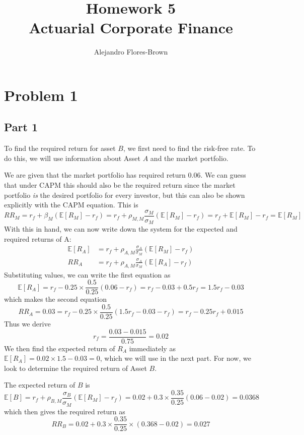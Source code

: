 \documentclass[12pt, letterpaper, parskip = full]{article}
\title{Homework 5 \\ Actuarial Corporate Finance}
\author{Alejandro Flores-Brown}
\newcommand{\Ex}[1]{\mathbb{E}\left[#1\right]}
\begin{document}
    \maketitle

    \section{Problem 1}

    \subsection{Part 1}

    To find the required return for asset \(B\), we first need to find the risk-free rate. To do this, we will use information about Asset \(A\) and the market portfolio. 

    We are given that the market portfolio has required return \(0.06\). We can guess that under CAPM this should also be the required return since the market portfolio \emph{is} the desired portfolio for every investor, but this can also be shown explicitly with the CAPM equation. This is 
    \[ RR_M = r_f + \beta_M (\Ex{R_M} - r_f) = r_f + \rho_{M,M} \frac{\sigma_M}{\sigma_M} (\Ex{R_M} - r_f) = r_f + \Ex{R_M} - r_f = \Ex{R_M}   \]
    With this in hand, we can now write down the system for the expected and required returns of A:
    \begin{align*}
    \Ex{R_A} &= r_f + \rho_{A,M} \frac{\sigma_A}{\sigma_M} (\Ex{R_M} - r_f) \\
    RR_A &= r_f + \rho_{A,M} \frac{\sigma_A}{\sigma_M} (\Ex{R_A} - r_f)
    \end{align*}
    Substituting values, we can write the first equation as
    \[ \Ex{R_A} = r_f - 0.25 \times \frac{0.5}{0.25} (0.06 - r_f) = r_f - 0.03 + 0.5 r_f = 1.5 r_f - 0.03 \]
    which makes the second equation
    \[ RR_A = 0.03 = r_f - 0.25 \times \frac{0.5}{0.25} (1.5 r_f - 0.03 - r_f) = r_f - 0.25 r_f + 0.015  \]
    Thus we derive
    \[ r_f = \frac{0.03 - 0.015}{0.75} = 0.02 \]
    We then find the expected return of \(R_A\) immediately as \(\Ex{R_A} = 0.02 \times 1.5 - 0.03 = 0\), which we will use in the next part. For now, we look to determine the required return of Asset \(B\).

    The expected return of \(B\) is
    \[ \Ex{B} = r_f + \rho_{B,M} \frac{\sigma_B}{\sigma_M} (\Ex{R_M} - r_f) = 0.02 + 0.3 \times \frac{0.35}{0.25} (0.06 - 0.02) = 0.0368   \]
    which then gives the required return as
    \[  \boxed{RR_B = 0.02 + 0.3 \times \frac{0.35}{0.25} \times (0.368 - 0.02) = 0.027}  \]
\end{document}
